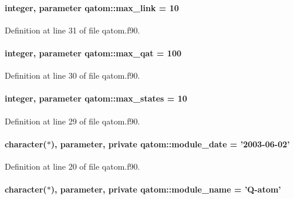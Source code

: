 \hypertarget{classqatom_a9ffa057551e3d0e26b8055ea44231d33}{
\paragraph[{max\-\_\-link}]{\setlength{\rightskip}{0pt plus 5cm}integer, parameter qatom\-::max\-\_\-link = 10}}\label{classqatom_a9ffa057551e3d0e26b8055ea44231d33}


Definition at line 31 of file qatom.\-f90.

\hypertarget{classqatom_aed28407cee717496e5e81de3a1768577}{
\paragraph[{max\-\_\-qat}]{\setlength{\rightskip}{0pt plus 5cm}integer, parameter qatom\-::max\-\_\-qat = 100}}\label{classqatom_aed28407cee717496e5e81de3a1768577}


Definition at line 30 of file qatom.\-f90.

\hypertarget{classqatom_ad89179e7bcdef29e13211330d1b8fd20}{
\paragraph[{max\-\_\-states}]{\setlength{\rightskip}{0pt plus 5cm}integer, parameter qatom\-::max\-\_\-states = 10}}\label{classqatom_ad89179e7bcdef29e13211330d1b8fd20}


Definition at line 29 of file qatom.\-f90.

\hypertarget{classqatom_a4ff02bb91e09846e9cfcc26a57bfd818}{
\paragraph[{module\-\_\-date}]{\setlength{\rightskip}{0pt plus 5cm}character($\ast$), parameter, private qatom\-::module\-\_\-date = '2003-\/06-\/02'\hspace{0.3cm}{\ttfamily [private]}}}\label{classqatom_a4ff02bb91e09846e9cfcc26a57bfd818}


Definition at line 20 of file qatom.\-f90.

\hypertarget{classqatom_a80c441b3b38961821d4ad264eadda14f}{
\paragraph[{module\-\_\-name}]{\setlength{\rightskip}{0pt plus 5cm}character($\ast$), parameter, private qatom\-::module\-\_\-name = 'Q-\/atom'\hspace{0.3cm}{\ttfamily [private]}}}\label{classqatom_a80c441b3b38961821d4ad264eadda14f}



